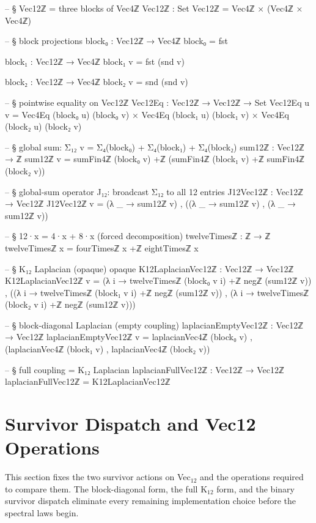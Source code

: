 \documentclass[11pt,a4paper]{book}
\def\texorpdfstring#1#2{#2}%
\begin{document}
\begin{code}
-- § Vec12ℤ = three blocks of Vec4ℤ
Vec12ℤ : Set
Vec12ℤ = Vec4ℤ × (Vec4ℤ × Vec4ℤ)

-- § block projections
block₀ : Vec12ℤ → Vec4ℤ
block₀ = fst

block₁ : Vec12ℤ → Vec4ℤ
block₁ v = fst (snd v)

block₂ : Vec12ℤ → Vec4ℤ
block₂ v = snd (snd v)

-- § pointwise equality on Vec12ℤ
Vec12Eq : Vec12ℤ → Vec12ℤ → Set
Vec12Eq u v = Vec4Eq (block₀ u) (block₀ v) × Vec4Eq (block₁ u) (block₁ v) × Vec4Eq (block₂ u) (block₂ v)

-- § global sum: Σ₁₂ v = Σ₄(block₀) + Σ₄(block₁) + Σ₄(block₂)
sum12ℤ : Vec12ℤ → ℤ
sum12ℤ v = sumFin4ℤ (block₀ v) +ℤ (sumFin4ℤ (block₁ v) +ℤ sumFin4ℤ (block₂ v))

-- § global-sum operator J₁₂: broadcast Σ₁₂ to all 12 entries
J12Vec12ℤ : Vec12ℤ → Vec12ℤ
J12Vec12ℤ v = (λ _ → sum12ℤ v) , ((λ _ → sum12ℤ v) , (λ _ → sum12ℤ v))

-- § 12·x = 4·x + 8·x (forced decomposition)
twelveTimesℤ : ℤ → ℤ
twelveTimesℤ x = fourTimesℤ x +ℤ eightTimesℤ x

-- § K₁₂ Laplacian (opaque)
opaque
  K12LaplacianVec12ℤ : Vec12ℤ → Vec12ℤ
  K12LaplacianVec12ℤ v =
    (λ i → twelveTimesℤ (block₀ v i) +ℤ negℤ (sum12ℤ v)) ,
    ((λ i → twelveTimesℤ (block₁ v i) +ℤ negℤ (sum12ℤ v)) ,
     (λ i → twelveTimesℤ (block₂ v i) +ℤ negℤ (sum12ℤ v)))

-- § block-diagonal Laplacian (empty coupling)
laplacianEmptyVec12ℤ : Vec12ℤ → Vec12ℤ
laplacianEmptyVec12ℤ v = laplacianVec4ℤ (block₀ v) , (laplacianVec4ℤ (block₁ v) , laplacianVec4ℤ (block₂ v))

-- § full coupling = K₁₂ Laplacian
laplacianFullVec12ℤ : Vec12ℤ → Vec12ℤ
laplacianFullVec12ℤ = K12LaplacianVec12ℤ
\end{code}

\section{Survivor Dispatch and Vec\texorpdfstring{$_{12}$}{12} Operations}

This section fixes the two survivor actions on Vec$_{12}$ and the operations
required to compare them.  The block-diagonal form, the full K$_{12}$ form,
and the binary survivor dispatch eliminate every remaining implementation
choice before the spectral laws begin.
\end{document}

